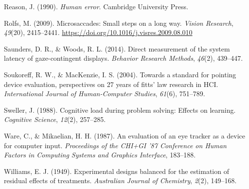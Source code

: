 \documentclass[
  11pt,
  11pt,
  letterpaper]{article}
\newlength{\cslhangindent}
\newenvironment{CSLReferences}[2] %
 {\begin{list}{}{%
  \setlength{\itemindent}{0pt}
  \setlength{\leftmargin}{0pt}
  \setlength{\parsep}{0pt}
  \ifodd #1
   \setlength{\leftmargin}{\cslhangindent}
   \setlength{\itemindent}{-1\cslhangindent}
  \fi
  \setlength{\itemsep}{#2\baselineskip}}}
 {\end{list}}
\begin{document}
\begin{CSLReferences}{1}{0}
Reason, J. (1990). \emph{Human error}. Cambridge University Press.

Rolfs, M. (2009). Microsaccades: Small steps on a long way. \emph{Vision
Research}, \emph{49}(20), 2415--2441.
\url{https://doi.org/10.1016/j.visres.2009.08.010}

Saunders, D. R., \& Woods, R. L. (2014). Direct measurement of the
system latency of gaze-contingent displays. \emph{Behavior Research
Methods}, \emph{46}(2), 439--447.

Soukoreff, R. W., \& MacKenzie, I. S. (2004). Towards a standard for
pointing device evaluation, perspectives on 27 years of fitts' law
research in HCI. \emph{International Journal of Human-Computer Studies},
\emph{61}(6), 751--789.

Sweller, J. (1988). Cognitive load during problem solving: Effects on
learning. \emph{Cognitive Science}, \emph{12}(2), 257--285.

Ware, C., \& Mikaelian, H. H. (1987). An evaluation of an eye tracker as
a device for computer input. \emph{Proceedings of the CHI+GI '87
Conference on Human Factors in Computing Systems and Graphics
Interface}, 183--188.

Williams, E. J. (1949). Experimental designs balanced for the estimation
of residual effects of treatments. \emph{Australian Journal of
Chemistry}, \emph{2}(2), 149--168.

\end{CSLReferences}
\end{document}
